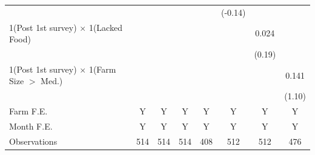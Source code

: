 {\begin{tabular*}{\hsize}{@{\hskip\tabcolsep\extracolsep\fill}l*{7}{c}}
                &                  &                  &                  &                  &  (-0.14)         &                  &                  \\
1(Post 1st survey) $\times$ 1(Lacked Food)&                  &                  &                  &                  &                  &    0.024         &                  \\
                &                  &                  &                  &                  &                  &   (0.19)         &                  \\
1(Post 1st survey) $\times$ 1(Farm Size $>$ Med.)&                  &                  &                  &                  &                  &                  &    0.141         \\
                &                  &                  &                  &                  &                  &                  &   (1.10)         \\
\midrule
Farm F.E.       &        Y         &        Y         &        Y         &        Y         &        Y         &        Y         &        Y         \\
Month F.E.      &        Y         &        Y         &        Y         &        Y         &        Y         &        Y         &        Y         \\
Observations    &      514         &      514         &      514         &      408         &      512         &      512         &      476         \\
\bottomrule
\end{tabular*}
}
